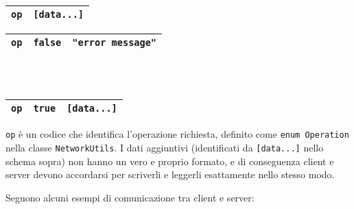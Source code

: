 \documentclass[a4paper,11pt] {article}
\begin{document}
\begin{multicols}{2}
	\begin{table}[H]
		\center
		\begin{tabular}{|l|l|}
			\hline
			\texttt{op} & \texttt{[data...]} \\ \hline
		\end{tabular}
	\end{table}

	\columnbreak

	\begin{table}[H]
		\center
		\begin{tabular}{|l|l|l|}
			\hline
			\texttt{op} & \texttt{false} & \texttt{"error message"} \\ \hline
		\end{tabular}
		\\~\\
		\begin{tabular}{|l|l|l|}
			\hline
			\texttt{op} & \texttt{true} & \texttt{[data...]} \\ \hline
		\end{tabular}
	\end{table}
\end{multicols}

\texttt{op} è un codice che identifica l'operazione richiesta, definito come \texttt{enum Operation} nella classe \texttt{NetworkUtils}.
I dati aggiuntivi (identificati da \texttt{[data...]} nello schema sopra) non hanno un vero e proprio formato, e di conseguenza client e server devono accordarsi per scriverli e leggerli esattamente nello stesso modo.

Seguono alcuni esempi di comunicazione tra client e server:
\end{document}
